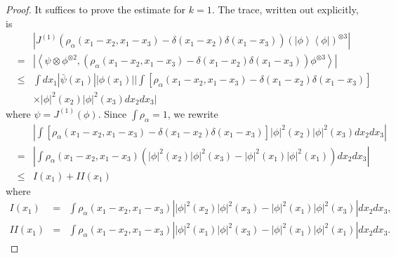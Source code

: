 \documentclass[12pt,letterpaper,leqno]{amsart}
\theoremstyle{plain}
\numberwithin{equation}{section}
\numberwithin{theorem}{section}
\numberwithin{proposition}{section}
\numberwithin{lemma}{section}
\numberwithin{corollary}{section}
\begin{document}
\begin{proof}
It suffices to prove the estimate for $k=1$. The trace, written out
explicitly, is%
\begin{eqnarray*}
&&\left\vert J^{(1)}\left( \rho _{\alpha }\left(
x_{1}-x_{2},x_{1}-x_{3}\right) -\delta \left( x_{1}-x_{2}\right) \delta
\left( x_{1}-x_{3}\right) \right) \left( \left\vert \phi \right\rangle
\left\langle \phi \right\vert \right) ^{\otimes 3}\right\vert \\
&=&\left\vert \left\langle \psi \otimes \phi ^{\otimes 2},\left( \rho
_{\alpha }\left( x_{1}-x_{2},x_{1}-x_{3}\right) -\delta \left(
x_{1}-x_{2}\right) \delta \left( x_{1}-x_{3}\right) \right) \phi ^{\otimes
3}\right\rangle \right\vert \\
&\leqslant &\int dx_{1}\left\vert \bar{\psi}(x_{1})\right\vert \left\vert
\phi (x_{1})\right\vert |\int \left[ \rho _{\alpha }\left(
x_{1}-x_{2},x_{1}-x_{3}\right) -\delta \left( x_{1}-x_{2}\right) \delta
\left( x_{1}-x_{3}\right) \right] \\
&&\times \left\vert \phi \right\vert ^{2}(x_{2})\left\vert \phi \right\vert
^{2}(x_{3})dx_{2}dx_{3}|
\end{eqnarray*}%
where $\psi =J^{(1)}\left( \phi \right) $. Since $\int \rho _{\alpha }=1$,
we rewrite%
\begin{eqnarray*}
&&|\int \left[ \rho _{\alpha }\left( x_{1}-x_{2},x_{1}-x_{3}\right) -\delta
\left( x_{1}-x_{2}\right) \delta \left( x_{1}-x_{3}\right) \right]
\left\vert \phi \right\vert ^{2}(x_{2})\left\vert \phi \right\vert
^{2}(x_{3})dx_{2}dx_{3}| \\
&=&|\int \rho _{\alpha }\left( x_{1}-x_{2},x_{1}-x_{3}\right) \left(
\left\vert \phi \right\vert ^{2}(x_{2})\left\vert \phi \right\vert
^{2}(x_{3})-\left\vert \phi \right\vert ^{2}(x_{1})\left\vert \phi
\right\vert ^{2}(x_{1})\right) dx_{2}dx_{3}| \\
&\leqslant &I(x_{1})+II(x_{1})
\end{eqnarray*}%
where%
\begin{eqnarray*}
I(x_{1}) &=&\int \rho _{\alpha }\left( x_{1}-x_{2},x_{1}-x_{3}\right)
\left\vert \left\vert \phi \right\vert ^{2}(x_{2})\left\vert \phi
\right\vert ^{2}(x_{3})-\left\vert \phi \right\vert ^{2}(x_{1})\left\vert
\phi \right\vert ^{2}(x_{3})\right\vert dx_{2}dx_{3}, \\
II(x_{1}) &=&\int \rho _{\alpha }\left( x_{1}-x_{2},x_{1}-x_{3}\right)
\left\vert \left\vert \phi \right\vert ^{2}(x_{1})\left\vert \phi
\right\vert ^{2}(x_{3})-\left\vert \phi \right\vert ^{2}(x_{1})\left\vert
\phi \right\vert ^{2}(x_{1})\right\vert dx_{2}dx_{3}.

\end{eqnarray*}
\end{proof}
\end{document}

